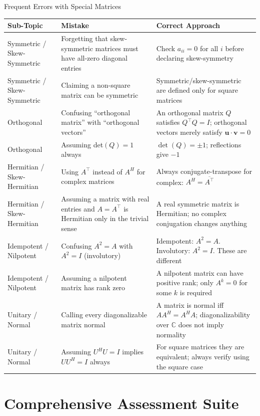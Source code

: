 \documentclass[12pt,a4paper]{article}
\begin{document}
\begin{mistakebox}{Frequent Errors with Special Matrices}
\begin{tabular}{@{}p{4.0cm} p{5.5cm} p{5.0cm}@{}}
\toprule
\textbf{Sub-Topic} & \textbf{Mistake} & \textbf{Correct Approach} \\
\midrule
Symmetric / Skew-Symmetric & Forgetting that skew-symmetric matrices must have all-zero diagonal entries & Check $a_{ii} = 0$ for all $i$ before declaring skew-symmetry \\
Symmetric / Skew-Symmetric & Claiming a non-square matrix can be symmetric & Symmetric/skew-symmetric are defined only for square matrices \\
Orthogonal & Confusing ``orthogonal matrix'' with ``orthogonal vectors'' & An orthogonal matrix $Q$ satisfies $Q^\top Q = I$; orthogonal vectors merely satisfy $\mathbf{u}\cdot\mathbf{v}=0$ \\
Orthogonal & Assuming det$(Q) = 1$ always & $\det(Q) = \pm 1$; reflections give $-1$ \\
Hermitian / Skew-Hermitian & Using $A^\top$ instead of $A^H$ for complex matrices & Always conjugate-transpose for complex: $A^H = \overline{A^\top}$ \\
Hermitian / Skew-Hermitian & Assuming a matrix with real entries and $A = A^\top$ is Hermitian only in the trivial sense & A real symmetric matrix is Hermitian; no complex conjugation changes anything \\
Idempotent / Nilpotent & Confusing $A^2 = A$ with $A^2 = I$ (involutory) & Idempotent: $A^2 = A$. Involutory: $A^2 = I$. These are different \\
Idempotent / Nilpotent & Assuming a nilpotent matrix has rank zero & A nilpotent matrix can have positive rank; only $A^k = 0$ for some $k$ is required \\
Unitary / Normal & Calling every diagonalizable matrix normal & A matrix is normal iff $AA^H = A^H A$; diagonalizability over $\mathbb{C}$ does not imply normality \\
Unitary / Normal & Assuming $U^H U = I$ implies $UU^H = I$ always & For square matrices they are equivalent; always verify using the square case \\
\bottomrule
\end{tabular}
\end{mistakebox}

\section{Comprehensive Assessment Suite}
\end{document}
